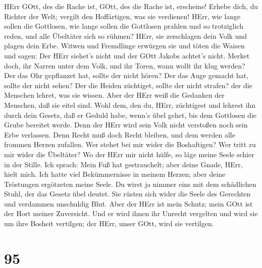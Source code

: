  HErr GOtt, des die Rache ist, GOtt, des die Rache ist,
erscheine!  Erhebe dich, du Richter der Welt; vergilt den
Hoffärtigen, was sie verdienen!  HErr, wie lange sollen die
Gottlosen, wie lange sollen die Gottlosen prahlen  und so
trotziglich reden, und alle Übeltäter sich so rühmen?  HErr,
sie zerschlagen dein Volk und plagen dein Erbe.  Witwen und
Fremdlinge erwürgen sie und töten die Waisen  und sagen: Der
HErr siehet's nicht und der GOtt Jakobs achtet's nicht. 
Merket doch, ihr Narren unter dem Volk, und ihr Toren, wann wollt ihr
klug werden?  Der das Ohr gepflanzet hat, sollte der nicht
hören? Der das Auge gemacht hat, sollte der nicht sehen? 
Der die Heiden züchtiget, sollte der nicht strafen? der die Menschen
lehret, was sie wissen.  Aber der HErr weiß die Gedanken
der Menschen, daß sie eitel sind.  Wohl dem, den du, HErr,
züchtigest und lehrest ihn durch dein Gesetz,  daß er
Geduld habe, wenn's übel gehet, bis dem Gottlosen die Grube bereitet
werde.  Denn der HErr wird sein Volk nicht verstoßen noch
sein Erbe verlassen.  Denn Recht muß doch Recht bleiben,
und dem werden alle frommen Herzen zufallen.  Wer stehet
bei mir wider die Boshaftigen? Wer tritt zu mir wider die Übeltäter?
 Wo der HErr mir nicht hülfe, so läge meine Seele schier in
der Stille.  Ich sprach: Mein Fuß hat gestrauchelt; aber
deine Gnade, HErr, hielt mich.  Ich hatte viel
Bekümmernisse in meinem Herzen; aber deine Tröstungen ergötzeten meine
Seele.  Du wirst ja nimmer eins mit dem schädlichen Stuhl,
der das Gesetz übel deutet.  Sie rüsten sich wider die
Seele des Gerechten und verdammen unschuldig Blut.  Aber
der HErr ist mein Schutz; mein GOtt ist der Hort meiner Zuversicht.
 Und er wird ihnen ihr Unrecht vergelten und wird sie um
ihre Bosheit vertilgen; der HErr, unser GOtt, wird sie vertilgen.

\hypertarget{section-94}{%
\section{95}\label{section-94}}

